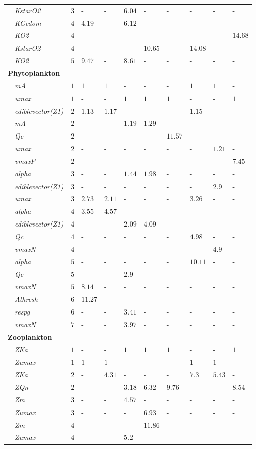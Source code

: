 \documentclass[letterpaper,12pt,oneside]{article}\usepackage[]{graphicx}\usepackage[]{color}
\begin{document}
\begin{table}[!tbp]
{\begin{center}
\begin{tabular}{llllllllll}
~~\scriptsize{\textit{KstarO2}}&$3$&-&-&$6.04$&-&-&-&-&-\tabularnewline
~~\scriptsize{\textit{KGcdom}}&$4$&$4.19$&-&$6.12$&-&-&-&-&-\tabularnewline
~~\scriptsize{\textit{KO2}}&$4$&-&-&-&-&-&-&-&$14.68$\tabularnewline
~~\scriptsize{\textit{KstarO2}}&$4$&-&-&-&$10.65$&-&$14.08$&-&-\tabularnewline
~~\scriptsize{\textit{KO2}}&$5$&$9.47$&-&$8.61$&-&-&-&-&-\tabularnewline
\hline
{\bfseries Phytoplankton}&&&&&&&&&\tabularnewline
~~\scriptsize{\textit{mA}}&$1$&$1$&$1$&-&-&-&$1$&$1$&-\tabularnewline
~~\scriptsize{\textit{umax}}&$1$&-&-&$1$&$1$&$1$&-&-&$1$\tabularnewline
~~\scriptsize{\textit{ediblevector(Z1)}}&$2$&$1.13$&$1.17$&-&-&-&$1.15$&-&-\tabularnewline
~~\scriptsize{\textit{mA}}&$2$&-&-&$1.19$&$1.29$&-&-&-&-\tabularnewline
~~\scriptsize{\textit{Qc}}&$2$&-&-&-&-&$11.57$&-&-&-\tabularnewline
~~\scriptsize{\textit{umax}}&$2$&-&-&-&-&-&-&$1.21$&-\tabularnewline
~~\scriptsize{\textit{vmaxP}}&$2$&-&-&-&-&-&-&-&$7.45$\tabularnewline
~~\scriptsize{\textit{alpha}}&$3$&-&-&$1.44$&$1.98$&-&-&-&-\tabularnewline
~~\scriptsize{\textit{ediblevector(Z1)}}&$3$&-&-&-&-&-&-&$2.9$&-\tabularnewline
~~\scriptsize{\textit{umax}}&$3$&$2.73$&$2.11$&-&-&-&$3.26$&-&-\tabularnewline
~~\scriptsize{\textit{alpha}}&$4$&$3.55$&$4.57$&-&-&-&-&-&-\tabularnewline
~~\scriptsize{\textit{ediblevector(Z1)}}&$4$&-&-&$2.09$&$4.09$&-&-&-&-\tabularnewline
~~\scriptsize{\textit{Qc}}&$4$&-&-&-&-&-&$4.98$&-&-\tabularnewline
~~\scriptsize{\textit{vmaxN}}&$4$&-&-&-&-&-&-&$4.9$&-\tabularnewline
~~\scriptsize{\textit{alpha}}&$5$&-&-&-&-&-&$10.11$&-&-\tabularnewline
~~\scriptsize{\textit{Qc}}&$5$&-&-&$2.9$&-&-&-&-&-\tabularnewline
~~\scriptsize{\textit{vmaxN}}&$5$&$8.14$&-&-&-&-&-&-&-\tabularnewline
~~\scriptsize{\textit{Athresh}}&$6$&$11.27$&-&-&-&-&-&-&-\tabularnewline
~~\scriptsize{\textit{respg}}&$6$&-&-&$3.41$&-&-&-&-&-\tabularnewline
~~\scriptsize{\textit{vmaxN}}&$7$&-&-&$3.97$&-&-&-&-&-\tabularnewline
\hline
{\bfseries Zooplankton}&&&&&&&&&\tabularnewline
~~\scriptsize{\textit{ZKa}}&$1$&-&-&$1$&$1$&$1$&-&-&$1$\tabularnewline
~~\scriptsize{\textit{Zumax}}&$1$&$1$&$1$&-&-&-&$1$&$1$&-\tabularnewline
~~\scriptsize{\textit{ZKa}}&$2$&-&$4.31$&-&-&-&$7.3$&$5.43$&-\tabularnewline
~~\scriptsize{\textit{ZQn}}&$2$&-&-&$3.18$&$6.32$&$9.76$&-&-&$8.54$\tabularnewline
~~\scriptsize{\textit{Zm}}&$3$&-&-&$4.57$&-&-&-&-&-\tabularnewline
~~\scriptsize{\textit{Zumax}}&$3$&-&-&-&$6.93$&-&-&-&-\tabularnewline
~~\scriptsize{\textit{Zm}}&$4$&-&-&-&$11.86$&-&-&-&-\tabularnewline
~~\scriptsize{\textit{Zumax}}&$4$&-&-&$5.2$&-&-&-&-&-\tabularnewline
\hline
\end{tabular}\end{center}}

\end{table}
\end{document}
